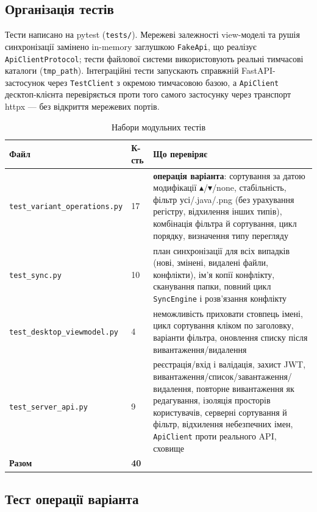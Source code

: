 \documentclass[12pt,a4paper]{article}
\begin{document}
\subsection{Організація тестів}

Тести написано на pytest (\texttt{tests/\allowbreak{}}). Мережеві залежності view-моделі та рушія синхронізації замінено in-memory заглушкою \texttt{FakeApi}, що реалізує \texttt{ApiClientProtocol}; тести файлової системи використовують реальні тимчасові каталоги (\texttt{tmp\_path}). Інтеграційні тести запускають справжній FastAPI-застосунок через \texttt{TestClient} з окремою тимчасовою базою, а \texttt{ApiClient} десктоп-клієнта перевіряється проти того самого застосунку через транспорт httpx --- без відкриття мережевих портів.

{\small
\begin{longtable}{@{}p{4.5cm}p{1.3cm}p{10.2cm}@{}}
\caption{Набори модульних тестів}\\
\toprule
\textbf{Файл} & \textbf{К-сть} & \textbf{Що перевіряє} \\
\midrule
\endhead
\texttt{test\_variant\_operations.py} & 17 & \textbf{операція варіанта}: сортування за датою модифікації $\blacktriangle$/$\blacktriangledown$/none, стабільність, фільтр усі/.java/.png (без урахування регістру, відхилення інших типів), комбінація фільтра й сортування, цикл порядку, визначення типу перегляду \\ \midrule
\texttt{test\_sync.py} & 10 & план синхронізації для всіх випадків (нові, змінені, видалені файли, конфлікти), ім'я копії конфлікту, сканування папки, повний цикл \texttt{SyncEngine} і розв'язання конфлікту \\ \midrule
\texttt{test\_desktop\_viewmodel.py} & 4 & неможливість приховати стовпець імені, цикл сортування кліком по заголовку, варіанти фільтра, оновлення списку після вивантаження/видалення \\ \midrule
\texttt{test\_server\_api.py} & 9 & реєстрація/вхід і валідація, захист JWT, вивантаження/список/завантаження/видалення, повторне вивантаження як редагування, ізоляція просторів користувачів, серверні сортування й фільтр, відхилення небезпечних імен, \texttt{ApiClient} проти реального API, сховище \\ \midrule
\textbf{Разом} & \textbf{40} &  \\ \midrule
\bottomrule
\end{longtable}}

\subsection{Тест операції варіанта}
\end{document}
